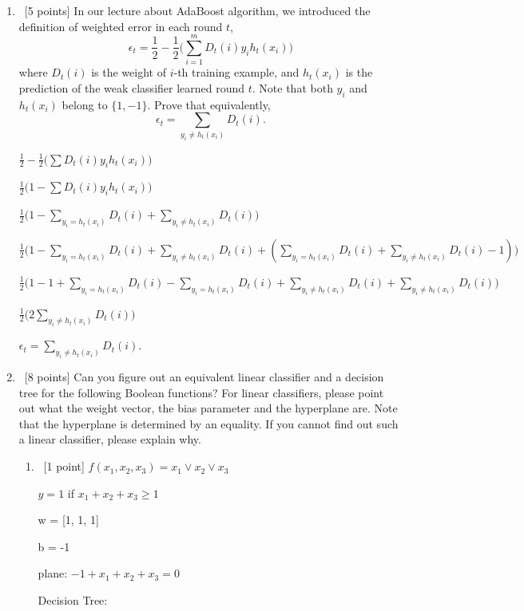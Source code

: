 \documentclass[12pt, fullpage,letterpaper]{article}
\begin{document}
\begin{enumerate}
\item~[5 points] In our lecture about AdaBoost algorithm, we introduced the definition of weighted error in each round $t$, 
\[
\epsilon_t = \frac{1}{2} - \frac{1}{2}\big(\sum_{i=1}^m D_t(i) y_i h_t(x_i)\big)
\]
where $D_t(i)$ is the weight of $i$-th training example, and $h_t(x_i)$ is the prediction of the weak classifier learned round $t$. Note that both $y_i$ and $h_t(x_i)$ belong to $\{1, -1\}$. Prove that equivalently,
\[
\epsilon_t = \sum_{y_i \neq h_t(x_i)} D_t(i).
\]

\bigskip
$\frac{1}{2} - \frac{1}{2}\big(\sum D_t(i) y_i h_t(x_i)\big)$

$\frac{1}{2}\big(1 - \sum D_t(i) y_i h_t(x_i)\big)$

$\frac{1}{2}\big(1 - \sum_{y_i = h_t(x_i)} D_t(i) + \sum_{y_i \neq h_t(x_i)} D_t(i)\big)$

$\frac{1}{2}\big(1 - \sum_{y_i = h_t(x_i)} D_t(i) + \sum_{y_i \neq h_t(x_i)} D_t(i) + (\sum_{y_i = h_t(x_i)} D_t(i) + \sum_{y_i \neq h_t(x_i)} D_t(i) - 1)\big)$

$\frac{1}{2}\big(1 - 1 + \sum_{y_i = h_t(x_i)}D_t(i) - \sum_{y_i = h_t(x_i)}D_t(i) + \sum_{y_i \neq h_t(x_i)}D_t(i) + \sum_{y_i \neq h_t(x_i)}D_t(i)\big)$

$\frac{1}{2}\big(2\sum_{y_i \neq h_t(x_i)}D_t(i)\big)$

$\epsilon_t = \sum_{y_i \neq h_t(x_i)} D_t(i).$

\bigskip

	\item~[8 points] Can you figure out an equivalent linear classifier and a decision tree for the following Boolean functions? For linear classifiers, please point out what the weight vector, the bias parameter and the hyperplane are. Note that the hyperplane is determined by an equality. If you cannot find out such a  linear classifier, please explain why. 
	\begin{enumerate}
		\item~[1 point] $f(x_1, x_2, x_3) = x_1 \lor x_2 \lor x_3$
		
		\bigskip
		$y = 1$ if $x_1 + x_2 + x_3 \ge 1$
		
		w = [1, 1, 1]
		
		b = -1
		
		plane: $-1 + x_1 + x_2 + x_3 = 0$
		
		Decision Tree:
		

\end{enumerate}
\end{enumerate}
\end{document}
